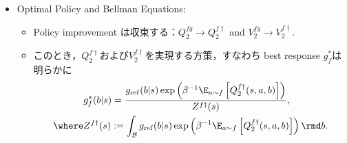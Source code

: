 \documentclass[a4paper,10pt,dvipdfmx]{jsarticle}
\begin{document}
\begin{itemize}
\begin{proof}
\begin{align}
            &\therefore \beta\mathcal{H}_{g_{\mathrm{ref}}}^{g'}z(s)+\E_{b\sim g'}\left[\bar{Q}_2^{fg}(s,b)\right]=\beta\log Z^{fg}(s)\\
            &\therefore \beta\mathcal{H}_{g_{\mathrm{ref}}}^{g'}(s)+\E_{b\sim g'}\left[\bar{Q}_2^{fg}(s,b)\right]\ge \beta\mathcal{H}_{g_{\mathrm{ref}}}^g(s)+\E_{b\sim g}\left[\bar{Q}_2^{fg}(s,b)\right]
        \end{align}
        \begin{align}
            Q_2^{fg}(s,a,b)&=r_2(s,a,b)+\gamma_2\E_{s'}\left[\beta\mathcal{H}_{g_{\mathrm{ref}}}^g(s')+\E_{b\sim g}\left[\bar{Q}_2^{fg}(s,b)\right]\right]\\
            &\le r_2(s,a,b)+\gamma_2\E_{s'}\left[\beta\mathcal{H}_{g_{\mathrm{ref}}}^{g'}(s')+\E_{b\sim g'}\left[\bar{Q}_2^{fg}(s,b)\right]\right]\\
            &\vdots\\
            &\le Q_2^{fg'}(s,a,b)
        \end{align}
        \begin{align}
            V_2^{fg}(s)&=\beta\mathcal{H}_{g_{\mathrm{ref}}}^g(s)+\E_{b\sim g}\left[\bar{Q}_2^{fg}(s,b)\right]\\
            &\le\beta\mathcal{H}_{g_{\mathrm{ref}}}^{g'}(s)+\E_{b\sim g'}\left[\bar{Q}_2^{fg}(s,b)\right]\\
            &=\beta\mathcal{H}_{g_{\mathrm{ref}}}^{g'}(s)+\E_{b\sim g'}\E_{a\sim f}\left[r_2(s,a,b)+\gamma_2\E_{s'}\left[V_2^{fg}(s')\right]\right]\\
            &\vdots\\
            &\le V_2^{fg'}(s)
        \end{align}
    \end{proof}
    \item Optimal Policy and Bellman Equations:
    \begin{itemize}
        \item Policy improvement は収束する：$Q_2^{fg}\to Q_2^{f\dag}$ and $V_2^{fg}\to V_2^{f\dag}$.
        \item このとき，$Q_2^{f\dag}$および$V_2^{f\dag}$を実現する方策，すなわち best response $g_f^*$は明らかに
        \begin{align}
            &g_f^*(b|s)=\dfrac{g_{\mathrm{ref}}(b|s)\exp\left(\beta^{-1}\E_{a\sim f}\left[Q_2^{f\dag}(s,a,b)\right]\right)}{Z^{f\dag}(s)},\\
        \where &Z^{f\dag}(s):=\int_{\mathcal{B}}g_{\mathrm{ref}}(b|s)\exp\left(\beta^{-1}\E_{a\sim f}\left[Q_2^{f\dag}(s,a,b)\right]\right)\rmd b.

\end{align}
\end{itemize}
\end{itemize}
\end{document}
